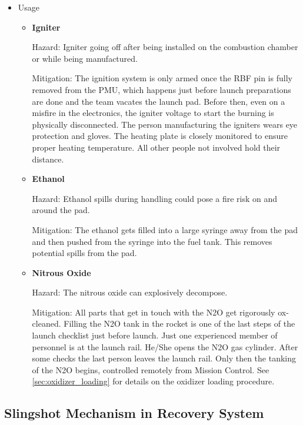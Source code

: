 \begin{itemize}
    \item Usage
    \begin{itemize}
        \item \textbf{Igniter}
        
        Hazard: Igniter going off after being installed on the combustion chamber or while being manufactured.
        
        Mitigation: The ignition system is only armed once the RBF pin is fully removed from the PMU, which happens just before launch preparations are done and the team vacates the launch pad. Before then, even on a misfire in the electronics, the igniter voltage to start the burning is physically disconnected. The person manufacturing the igniters wears eye protection and gloves. The heating plate is closely monitored to ensure proper heating temperature. All other people not involved hold their distance.
        
        \item \textbf{Ethanol}
        
        Hazard: Ethanol spills during handling could pose a fire risk on and around the pad.
        
        Mitigation: The ethanol gets filled into a large syringe away from the pad and then pushed from the syringe into the fuel tank. This removes potential spills from the pad.
        
        \item \textbf{Nitrous Oxide}
        
        Hazard: The nitrous oxide can explosively decompose.
        
        Mitigation: All parts that get in touch with the N2O get rigorously ox-cleaned. Filling the N2O tank in the rocket is one of the last steps of the launch checklist just before launch. Just one experienced member of personnel is at the launch rail. He/She opens the N2O gas cylinder. After some checks the last person leaves the launch rail. Only then the tanking of the N2O begins, controlled remotely from Mission Control. See \cref{sec:oxidizer_loading} for details on the oxidizer loading procedure.
    \end{itemize}
\end{itemize}

\subsection{Slingshot Mechanism in Recovery System}

